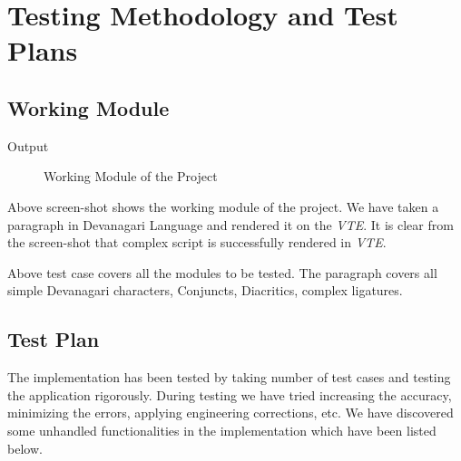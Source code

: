%

\chapter{Testing Methodology and Test Plans}
\section{Working Module}
		
Output

\begin{figure}[htbp]
\centerline{}
\caption{Working Module of the Project} \label{Gnome Terminal12}
\end{figure}

Above screen-shot shows the working module of the project. We have taken a paragraph in Devanagari Language and rendered it on the \textit{VTE}. It is clear from the screen-shot that complex script is successfully rendered in \textit{VTE}.

Above test case covers all the modules to be tested. The paragraph covers all simple Devanagari characters, Conjuncts, Diacritics, complex ligatures.

\section{Test Plan}
The implementation has been tested by taking number of test cases and testing the application rigorously. During testing we have tried increasing the accuracy, minimizing the errors, applying engineering corrections, etc. We have discovered some unhandled functionalities in the implementation which have been listed below.

